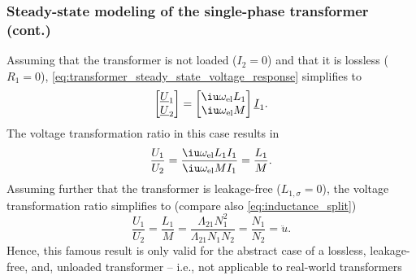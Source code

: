 \begin{frame}
	\frametitle{Steady-state modeling of the single-phase transformer (cont.)}
		Assuming that the transformer is not loaded ($I_2 = 0$) and that it is lossless ($R_1 = 0$), \eqref{eq:transformer_steady_state_voltage_response} simplifies to
		\begin{equation}
			\begin{bmatrix} \underline{U}_1 \\ \underline{U}_2 \end{bmatrix} = \begin{bmatrix} \iu \omega_\mathrm{el} L_1  \\ \iu \omega_\mathrm{el} M  \end{bmatrix} \underline{I}_1.
		\end{equation} \pause
		The voltage transformation ratio in this case results in
		\begin{equation}
			\frac{U_1}{U_2} = \frac{\iu \omega_{\mathrm{el}} L_1 I_1}{\iu \omega_{\mathrm{el}} M I_1}  = \frac{L_1}{M}.
		\end{equation}
		\pause
		Assuming further that the transformer is leakage-free ($L_{1,\sigma}=0$), the voltage transformation ratio simplifies to (compare also \eqref{eq:inductance_split})
		\begin{equation}
			\frac{U_1}{U_2} = \frac{L_1}{M} = \frac{\Lambda_{21}N_1^2}{\Lambda_{21}N_1 N_2}  = \frac{N_1}{N_2} = \ddot{u}.
			\label{eq:voltage_transformation_ratio}
		\end{equation}
		\pause
		Hence, this famous result is only valid for the abstract case of a lossless, leakage-free, and, unloaded transformer -- i.e., not applicable to real-world transformers 
\end{frame}

